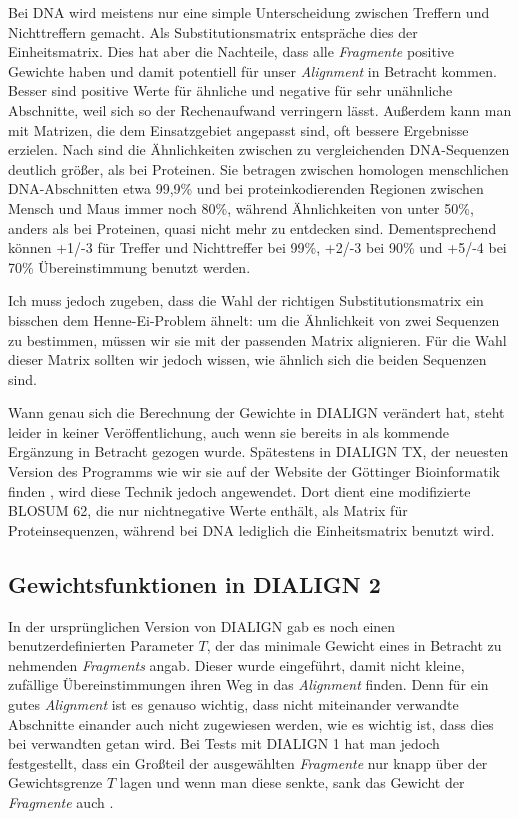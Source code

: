 Bei DNA wird meistens nur eine simple Unterscheidung zwischen Treffern und Nichttreffern gemacht. Als Substitutionsmatrix entspräche dies der Einheitsmatrix. Dies hat aber die Nachteile, dass alle \emph{Fragmente} positive Gewichte haben und damit potentiell für unser \emph{Alignment} in Betracht kommen. Besser sind positive Werte für ähnliche und negative für sehr unähnliche Abschnitte, weil sich so der Rechenaufwand verringern lässt. Außerdem kann man mit Matrizen, die dem Einsatzgebiet angepasst sind, oft bessere Ergebnisse erzielen. Nach \cite{p13} sind die Ähnlichkeiten zwischen zu vergleichenden DNA-Sequenzen deutlich größer, als bei Proteinen. Sie betragen zwischen homologen menschlichen DNA-Abschnitten etwa 99,9\% und bei proteinkodierenden Regionen zwischen Mensch und Maus immer noch 80\%, während Ähnlichkeiten von unter 50\%, anders als bei Proteinen, quasi nicht mehr zu entdecken sind. Dementsprechend können +1/-3 für Treffer und Nichttreffer bei 99\%, +2/-3 bei 90\% und +5/-4 bei 70\% Übereinstimmung benutzt werden.

Ich muss jedoch zugeben, dass die Wahl der richtigen Substitutionsmatrix ein bisschen dem Henne-Ei-Problem ähnelt: um die Ähnlichkeit von zwei Sequenzen zu bestimmen, müssen wir sie mit der passenden Matrix alignieren. Für die Wahl dieser Matrix sollten wir jedoch wissen, wie ähnlich sich die beiden Sequenzen sind.

Wann genau sich die Berechnung der Gewichte in DIALIGN verändert hat, steht leider in keiner Veröffentlichung, auch wenn sie bereits in \cite{mdw96} als kommende Ergänzung in Betracht gezogen wurde. Spätestens in DIALIGN TX, der neuesten Version des Programms wie wir sie auf der Website der Göttinger Bioinformatik finden \citep{DIALIGNTX}, wird diese Technik jedoch angewendet. Dort dient eine modifizierte BLOSUM 62, die nur nichtnegative Werte enthält, als Matrix für Proteinsequenzen, während bei DNA lediglich die Einheitsmatrix benutzt wird.

\subsection{Gewichtsfunktionen in DIALIGN 2} 

In der ursprünglichen Version von DIALIGN gab es noch einen benutzerdefinierten Parameter $T$, der das minimale Gewicht eines in Betracht zu nehmenden \emph{Fragments} angab. Dieser wurde eingeführt, damit nicht kleine, zufällige Übereinstimmungen ihren Weg in das \emph{Alignment} finden. Denn für ein gutes \emph{Alignment} ist es genauso wichtig, dass nicht miteinander verwandte Abschnitte einander auch nicht zugewiesen werden, wie es wichtig ist, dass dies bei verwandten getan wird. Bei Tests mit DIALIGN 1 hat man jedoch festgestellt, dass ein Großteil der ausgewählten \emph{Fragmente} nur knapp über der Gewichtsgrenze $T$ lagen und wenn man diese senkte, sank das Gewicht der \emph{Fragmente} auch \citep{mahd98}. 

